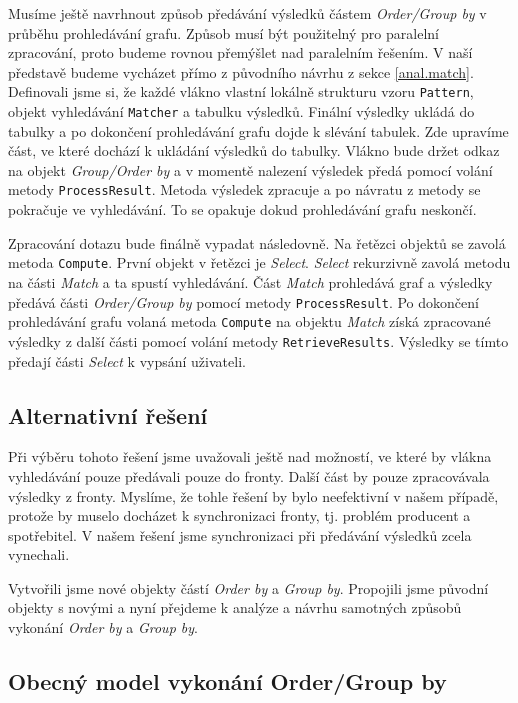 Musíme ještě navrhnout způsob předávání výsledků částem \textit{Order/Group by} v průběhu prohledávání grafu.
Způsob musí být použitelný pro paralelní zpracování, proto budeme rovnou přemýšlet nad paralelním řešením.
V naší představě budeme vycházet přímo z původního návrhu z sekce \ref{anal.match}.
Definovali jsme si, že každé vlákno vlastní lokálně strukturu vzoru \texttt{Pattern}, objekt vyhledávání \texttt{Matcher} a tabulku výsledků.
Finální výsledky ukládá do tabulky a po dokončení prohledávání grafu dojde k slévání tabulek.
Zde upravíme část, ve které dochází k ukládání výsledků do tabulky.
Vlákno bude držet odkaz na objekt \textit{Group/Order by} a v momentě nalezení výsledek předá pomocí volání metody \texttt{ProcessResult}.
Metoda výsledek zpracuje a po návratu z metody se pokračuje ve vyhledávání.
To se opakuje dokud prohledávání grafu neskončí.

Zpracování dotazu bude finálně vypadat následovně.
Na řetězci objektů se zavolá metoda \texttt{Compute}.
První objekt v řetězci je \textit{Select}.
\textit{Select} rekurzivně zavolá metodu na části \textit{Match} a ta spustí vyhledávání.
Část \textit{Match} prohledává graf a výsledky předává části \textit{Order/Group by} pomocí metody \texttt{ProcessResult}.
Po dokončení prohledávání grafu volaná metoda \texttt{Compute} na objektu \textit{Match} získá zpracované výsledky z další části pomocí volání metody \texttt{RetrieveResults}.
Výsledky se tímto předají části \textit{Select} k vypsání uživateli. 

\subsection{Alternativní řešení}

Při výběru tohoto řešení jsme uvažovali ještě nad možností, ve které by vlákna vyhledávání pouze předávali pouze do fronty.
Další část by pouze zpracovávala výsledky z fronty.
Myslíme, že tohle řešení by bylo neefektivní v našem případě, protože by muselo docházet k synchronizaci fronty, tj. problém producent a spotřebitel.
V našem řešení jsme synchronizaci při předávání výsledků zcela vynechali.

Vytvořili jsme nové objekty částí \textit{Order by} a \textit{Group by}.
Propojili jsme původní objekty s novými a nyní přejdeme k analýze a návrhu samotných způsobů vykonání \textit{Order by} a \textit{Group by}.

\subsection{Obecný model vykonání Order/Group by}

